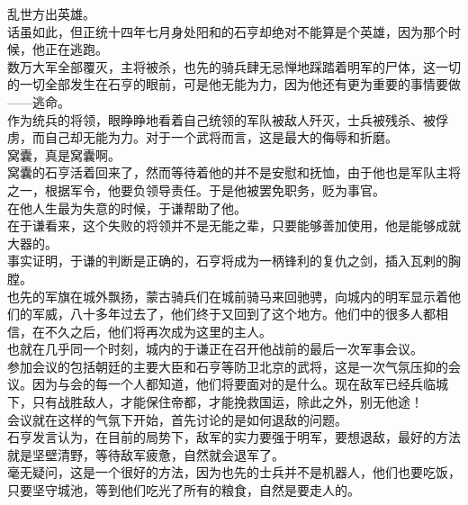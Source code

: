\begin{multicols}{\theparacolNo}
乱世方出英雄。\\

话虽如此，但正统十四年七月身处阳和的石亨却绝对不能算是个英雄，因为那个时候，他正在逃跑。\\

数万大军全部覆灭，主将被杀，也先的骑兵肆无忌惮地踩踏着明军的尸体，这一切的一切全部发生在石亨的眼前，可是他无能为力，因为他还有更为重要的事情要做——逃命。\\

作为统兵的将领，眼睁睁地看着自己统领的军队被敌人歼灭，士兵被残杀、被俘虏，而自己却无能为力。对于一个武将而言，这是最大的侮辱和折磨。\\

窝囊，真是窝囊啊。\\

窝囊的石亨活着回来了，然而等待着他的并不是安慰和抚恤，由于他也是军队主将之一，根据军令，他要负领导责任。于是他被罢免职务，贬为事官。\\

在他人生最为失意的时候，于谦帮助了他。\\

在于谦看来，这个失败的将领并不是无能之辈，只要能够善加使用，他是能够成就大器的。\\

事实证明，于谦的判断是正确的，石亨将成为一柄锋利的复仇之剑，插入瓦剌的胸膛。\\

也先的军旗在城外飘扬，蒙古骑兵们在城前骑马来回驰骋，向城内的明军显示着他们的军威，八十多年过去了，他们终于又回到了这个地方。他们中的很多人都相信，在不久之后，他们将再次成为这里的主人。\\

也就在几乎同一个时刻，城内的于谦正在召开他战前的最后一次军事会议。\\

参加会议的包括朝廷的主要大臣和石亨等防卫北京的武将，这是一次气氛压抑的会议。因为与会的每一个人都知道，他们将要面对的是什么。现在敌军已经兵临城下，只有战胜敌人，才能保住帝都，才能挽救国运，除此之外，别无他途！\\

会议就在这样的气氛下开始，首先讨论的是如何退敌的问题。\\

石亨发言认为，在目前的局势下，敌军的实力要强于明军，要想退敌，最好的方法就是坚壁清野，等待敌军疲惫，自然就会退军了。\\

毫无疑问，这是一个很好的方法，因为也先的士兵并不是机器人，他们也要吃饭，只要坚守城池，等到他们吃光了所有的粮食，自然是要走人的。\\


\end{multicols}
